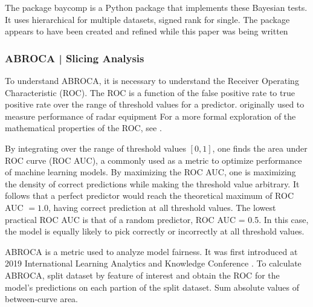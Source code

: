 \documentclass{article}
\begin{document}
                \newline
                The package baycomp \cite{baycomp} is a Python package that implements these Bayesian tests.
                It uses hierarchical for multiple datasets, signed rank for single. 
                The package appears to have been created and refined while this paper was being written \cite{stat2017}

                \subsubsection{ABROCA | Slicing Analysis}

                To understand ABROCA, it is necessary to understand the Receiver Operating Characteristic (ROC).
                The ROC is a function of the false positive rate to true positive rate over the range of threshold values for a predictor.
                originally used to measure performance of radar equipment
                For a more formal exploration of the mathematical properties of the ROC, see \cite{roc2014}.
                
                By integrating over the range of threshold values $[0, 1]$, one finds the area under ROC curve (ROC AUC), a commonly used as a metric to optimize performance of machine learning models.
                By maximizing the ROC AUC, one is maximizing the density of correct predictions while making the threshold value arbitrary.
                It follows that a perfect predictor would reach the theoretical maximum of ROC AUC $= 1.0$, having correct prediction at all threshold values.
                The lowest practical ROC AUC is that of a random predictor, ROC AUC = 0.5. In this case, the model is equally likely to pick correctly or incorrectly at all threshold values.
                
                ABROCA is a metric used to analyze model fairness.
                It was first introduced at 2019 International Learning Analytics and Knowledge Conference \cite{eval2019}.
                To calculate ABROCA, split dataset by feature of interest and obtain the ROC for the model's predictions on each partion of the split dataset.
                Sum absolute values of between-curve area.
\end{document}
